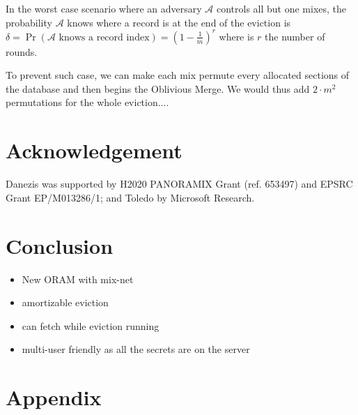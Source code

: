 \documentclass[USenglish,oneside,twocolumn]{article}
\begin{document}
In the worst case scenario where an adversary $\mathcal{A}$ controls all but one mixes, the probability  $\mathcal{A}$ knows where a record is at the end of the eviction is $\delta= \Pr \left ( \mathcal{A} \text{ knows a record index}\right ) = \left ( 1 - \frac{1}{m} \right )^r$ where is $r$ the number of rounds.

To prevent such case, we can make each mix permute every allocated sections of the database and then begins the Oblivious Merge. We would thus add $2 \cdot m^2$ permutations for the whole eviction....

\section{Acknowledgement}
Danezis was supported by H2020  PANORAMIX Grant (ref. 653497) and EPSRC Grant EP/M013286/1; and Toledo by Microsoft Research.


\section{Conclusion}\label{Conclusion}
\begin{itemize}
 \item New ORAM with mix-net
 \item amortizable eviction
 \item can fetch while eviction running
 \item multi-user friendly as all the secrets are on the server
\end{itemize}




\section{Appendix}
\end{document}
